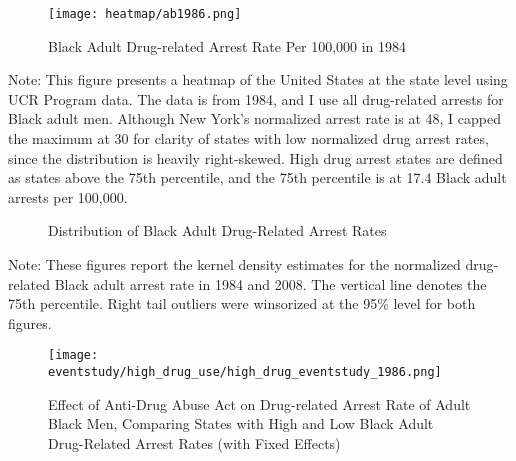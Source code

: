   \clearpage

  \begin{figure}[h]
    \caption{Black Adult Drug-related Arrest Rate Per 100,000 in 1984} 
    \centering
    \texttt{[image: heatmap/ab1986.png]}
    \label{fig:heatmap}
  \end{figure}
  
  \begin{footnotesize}
    \noindent Note: This figure presents a heatmap of the United States at the state level using UCR Program data. The data is from 1984, and I use all drug-related arrests for Black adult men. Although New York's normalized arrest rate is at 48, I capped the maximum at 30 for clarity of states with low normalized drug arrest rates, since the distribution is heavily right-skewed. High drug arrest states are defined as states above the 75th percentile, and the 75th percentile is at 17.4 Black adult arrests per 100,000.
  \end{footnotesize}
  
  \vspace*{8mm}
  
  \begin{figure}[h]
    \centering
    \caption{Distribution of Black Adult Drug-Related Arrest Rates}%
    \qquad
    \label{fig:density_jb}%
  \end{figure}
  \begin{footnotesize}
    \noindent Note: These figures report the kernel density estimates for the normalized drug-related Black adult arrest rate in 1984 and 2008. The vertical line denotes the 75th percentile. Right tail outliers were winsorized at the 95\% level for both figures.
  \end{footnotesize}
  
  \clearpage
     

  \begin{figure}[h]
    \caption{Effect of Anti-Drug Abuse Act on Drug-related Arrest Rate of Adult Black Men, Comparing States with High and Low Black Adult Drug-Related Arrest Rates (with Fixed Effects)}
    \centering
    \texttt{[image: eventstudy/high\_drug\_use/high\_drug\_eventstudy\_1986.png]}
    \label{fig:ab_es_1986}
  \end{figure}

